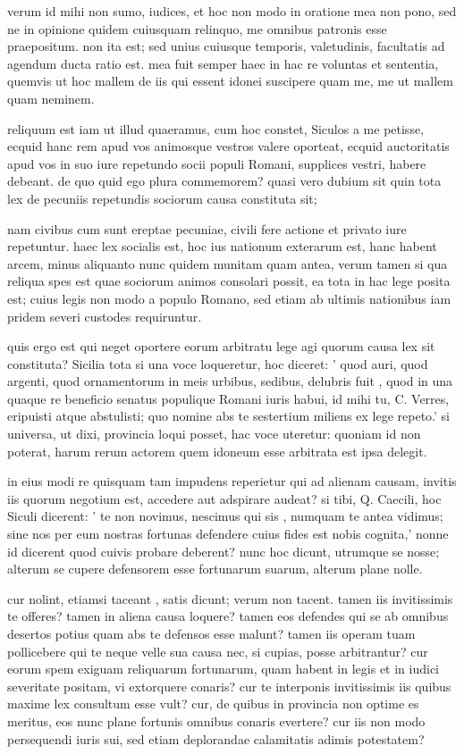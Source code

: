  verum id mihi non sumo, iudices, et hoc non modo in oratione mea non pono, sed ne in opinione quidem cuiusquam relinquo, me omnibus patronis esse praepositum. non ita est; sed unius cuiusque temporis, valetudinis, facultatis ad agendum ducta ratio est. mea fuit semper haec in hac re voluntas et sententia, quemvis ut hoc mallem de iis qui essent idonei suscipere quam me, me ut mallem quam neminem.

 reliquum est iam ut illud quaeramus, cum hoc constet, Siculos a me petisse, ecquid hanc rem apud vos animosque vestros valere oporteat, ecquid auctoritatis apud vos in suo iure repetundo socii populi Romani, supplices vestri, habere debeant. de quo quid ego plura commemorem? quasi vero dubium sit quin tota lex de pecuniis repetundis sociorum causa constituta sit;

 nam civibus cum sunt ereptae pecuniae, civili fere actione et privato iure repetuntur. haec lex socialis est, hoc ius nationum exterarum est, hanc habent arcem, minus aliquanto nunc quidem munitam quam antea, verum tamen si qua reliqua spes est quae sociorum animos consolari possit, ea tota in hac lege posita est; cuius legis non modo a populo Romano, sed etiam ab ultimis nationibus iam pridem severi custodes requiruntur.

 quis ergo est qui neget oportere eorum arbitratu lege agi quorum causa lex sit constituta? Sicilia tota si una voce loqueretur, hoc diceret: ' quod auri, quod argenti, quod ornamentorum in meis urbibus, sedibus, delubris fuit , quod in una quaque re beneficio senatus populique Romani iuris habui, id mihi tu, C. Verres, eripuisti atque abstulisti; quo nomine abs te sestertium miliens ex lege repeto.' si universa, ut dixi, provincia loqui posset, hac voce uteretur: quoniam id non poterat, harum rerum actorem quem idoneum esse arbitrata est ipsa delegit.

 in eius modi re quisquam tam impudens reperietur qui ad alienam causam, invitis iis quorum negotium est, accedere aut adspirare audeat? si tibi, Q. Caecili, hoc Siculi dicerent: ' te non novimus, nescimus qui sis , numquam te antea vidimus; sine nos per eum nostras fortunas defendere cuius fides est nobis cognita,' nonne id dicerent quod cuivis probare deberent? nunc hoc dicunt, utrumque se nosse; alterum se cupere defensorem esse fortunarum suarum, alterum plane nolle.

 cur nolint, etiamsi taceant , satis dicunt; verum non tacent. tamen iis invitissimis te offeres? tamen in aliena causa loquere? tamen eos defendes qui se ab omnibus desertos potius quam abs te defensos esse malunt? tamen iis operam tuam pollicebere qui te neque velle sua causa nec, si cupias, posse arbitrantur? cur eorum spem exiguam reliquarum fortunarum, quam habent in legis et in iudici severitate positam, vi extorquere conaris? cur te interponis invitissimis iis quibus maxime lex consultum esse vult? cur, de quibus in provincia non optime es meritus, eos nunc plane fortunis omnibus conaris evertere? cur iis non modo persequendi iuris sui, sed etiam deplorandae calamitatis adimis potestatem?

